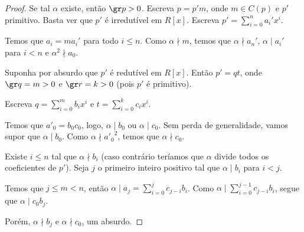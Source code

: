     \begin{proof}
        Se tal $\alpha$ existe, então $\gr p>0$.
        Escreva $p=p'm$, onde $m \in C(p)$ e $p'$ primitivo. Basta ver que $p'$ é irredutível em $R[x]$.
        Escreva $p'=\sum_{i=0}^n a_i' x^i$.
        
        Temos que $a_i=m a_i'$ para todo $i\leq n$. Como $\alpha \nmid m$, temos que  $\alpha\nmid a_n'$, $\alpha\mid a_i'$ para $i<n$ e $\alpha^2 \nmid a_0$.

        Suponha por absurdo que $p'$ é redutível em $R[x]$.
        Então $p'=qt$, onde $\gr q=m>0$ e $\gr r=k>0$  (pois $p'$ é primitivo).

        Escreva $q=\sum_{i=0}^m b_i x^i$ e $t=\sum_{i=0}^k c_i x^i$.

        Temos que $a'_0=b_0c_0$, logo, $\alpha \mid b_0$ ou $\alpha \mid c_0$. Sem perda de generalidade, vamos supor que $\alpha \mid b_0$. Como $\alpha\nmid {a'_0}^2$, temos que $\alpha \nmid c_0$.

        Existe $i\leq n$ tal que $\alpha \nmid b_i$ (caso contrário teríamos que $\alpha$ divide todos os coeficientes de $p'$). Seja $j$ o primeiro inteiro positivo tal que $\alpha\mid b_i$ para $i<j$.

        Temos que $j\leq m<n$, então $\alpha\mid a_j=\sum_{i=0}^j c_{j-i}b_i$. Como $\alpha\mid \sum_{i=0}^{j-1} c_{j-i}b_i$, segue que $\alpha\mid c_0 b_j$.
        
        Porém, $\alpha \nmid b_j$ e $\alpha \nmid c_0$, um absurdo.
    \end{proof}
